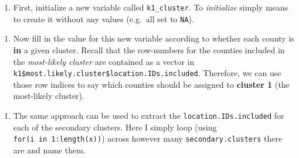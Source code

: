 \documentclass[
]{book}
\newenvironment{Shaded}{\begin{snugshade}}{\end{snugshade}}
\newcommand{\AttributeTok}[1]{\textcolor[rgb]{0.13,0.29,0.53}{#1}}
\newcommand{\ConstantTok}[1]{\textcolor[rgb]{0.56,0.35,0.01}{#1}}
\newcommand{\ControlFlowTok}[1]{\textcolor[rgb]{0.13,0.29,0.53}{\textbf{#1}}}
\newcommand{\DecValTok}[1]{\textcolor[rgb]{0.00,0.00,0.81}{#1}}
\newcommand{\FunctionTok}[1]{\textcolor[rgb]{0.13,0.29,0.53}{\textbf{#1}}}
\newcommand{\NormalTok}[1]{#1}
\newcommand{\OtherTok}[1]{\textcolor[rgb]{0.56,0.35,0.01}{#1}}
\newcommand{\SpecialCharTok}[1]{\textcolor[rgb]{0.81,0.36,0.00}{\textbf{#1}}}
\newcommand{\StringTok}[1]{\textcolor[rgb]{0.31,0.60,0.02}{#1}}
\providecommand{\tightlist}{%
  \setlength{\itemsep}{0pt}\setlength{\parskip}{0pt}}
\begin{document}
\begin{enumerate}
\def\labelenumi{\arabic{enumi}.}
\tightlist
\item
  First, initialize a new variable called \texttt{k1\_cluster}. To \emph{initialize} simply means to create it without any values (e.g.~all set to \texttt{NA}).
\end{enumerate}

\begin{Shaded}
\end{Shaded}

\begin{enumerate}
\def\labelenumi{\arabic{enumi}.}
\setcounter{enumi}{1}
\tightlist
\item
  Now fill in the value for this new variable according to whether each county is \textbf{in} a given cluster. Recall that the row-numbers for the counties included in the \emph{most-likely cluster} are contained as a vector in \texttt{k1\$most.likely.cluster\$location.IDs.included}. Therefore, we can use those row indices to say which counties should be assigned to \textbf{cluster 1} (the most-likely cluster).
\end{enumerate}

\begin{Shaded}
\end{Shaded}

\begin{enumerate}
\def\labelenumi{\arabic{enumi}.}
\setcounter{enumi}{2}
\tightlist
\item
  The same approach can be used to extract the \texttt{location.IDs.included} for each of the secondary clusters. Here I simply loop (using \texttt{for(i\ in\ 1:length(x))}) across however many \texttt{secondary.clusters} there are and name them.
\end{enumerate}

\begin{Shaded}
\end{Shaded}
\end{document}
